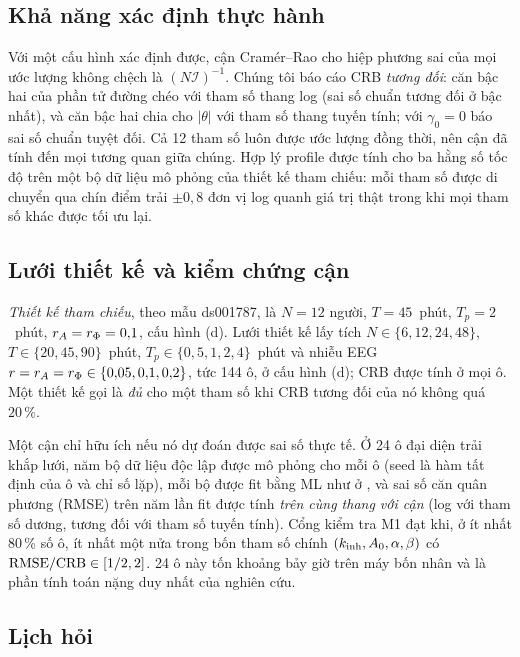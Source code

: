 \subsection{Khả năng xác định thực hành}
\label{sec:practical}

Với một cấu hình xác định được, cận Cramér--Rao \citep{Rao1945,Cramer1946} cho hiệp phương sai của mọi ước lượng không chệch là $(N\mathcal I)^{-1}$. Chúng tôi báo cáo CRB \emph{tương đối}: căn bậc hai của phần tử đường chéo với tham số thang log (sai số chuẩn tương đối ở bậc nhất), và căn bậc hai chia cho $|\theta|$ với tham số thang tuyến tính; với $\gamma_0=0$ báo sai số chuẩn tuyệt đối. Cả 12 tham số luôn được ước lượng đồng thời, nên cận đã tính đến mọi tương quan giữa chúng. Hợp lý profile \citep{Raue2009} được tính cho ba hằng số tốc độ trên một bộ dữ liệu mô phỏng của thiết kế tham chiếu: mỗi tham số được di chuyển qua chín điểm trải $\pm0{,}8$ đơn vị log quanh giá trị thật trong khi mọi tham số khác được tối ưu lại.

\subsection{Lưới thiết kế và kiểm chứng cận}
\label{sec:grid}

\emph{Thiết kế tham chiếu}, theo mẫu ds001787, là $N=12$ người, $T=45$~phút, $T_p=2$~phút, $r_{A}=r_{\Phi}=0{,}1$, cấu hình (d). Lưới thiết kế lấy tích $N\in\{6,12,24,48\}$, $T\in\{20,45,90\}$~phút, $T_p\in\{0{,}5,1,2,4\}$~phút và nhiễu EEG $r=r_{A}=r_{\Phi}\in\{0{,}05,0{,}1,0{,}2\}$, tức 144 ô, ở cấu hình (d); CRB được tính ở mọi ô. Một thiết kế gọi là \emph{đủ} cho một tham số khi CRB tương đối của nó không quá $20\,\%$.

Một cận chỉ hữu ích nếu nó dự đoán được sai số thực tế. Ở 24 ô đại diện trải khắp lưới, năm bộ dữ liệu độc lập được mô phỏng cho mỗi ô (seed là hàm tất định của ô và chỉ số lặp), mỗi bộ được fit bằng ML như ở , và sai số căn quân phương (RMSE) trên năm lần fit được tính \emph{trên cùng thang với cận} (log với tham số dương, tương đối với tham số tuyến tính). Cổng kiểm tra M1 đạt khi, ở ít nhất 80\,\% số ô, ít nhất một nửa trong bốn tham số chính $(k_{\mathrm{inh}},A_0,\alpha,\beta)$ có $\mathrm{RMSE}/\mathrm{CRB}\in[1/2,2]$. 24 ô này tốn khoảng bảy giờ trên máy bốn nhân và là phần tính toán nặng duy nhất của nghiên cứu.

\subsection{Lịch hỏi}
\label{sec:schedules}

